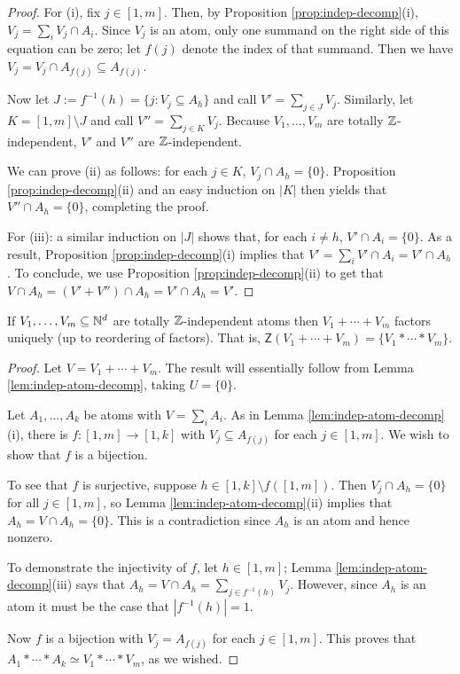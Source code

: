\begin{proof}
	For (i), fix $j\in [ 1,m ]$.
	Then, by Proposition \ref{prop:indep-decomp}(i), $V_j = \sum_i V_j \cap A_i$.
	Since $V_j$ is an atom, only one summand on the right side of this equation can be zero; let $f(j)$ denote the index of that summand.
	Then we have $V_j = V_j \cap A_{f(j)} \subseteq A_{f(j)}$.
	
	Now let $J := f^{-1}(h) = \{j: V_j \subseteq A_h\}$ and call $V' = \sum_{j\in J} V_j$.
	Similarly, let $K = [ 1,m ] \setminus J$ and call $V'' = \sum_{j\in K} V_j$.
	Because $V_1,\dots, V_m$ are totally $\mathbb{Z}$-independent, $V'$ and $V''$ are $\mathbb{Z}$-independent.

	We can prove (ii) as follows: for each $j\in K$, $V_j\cap A_h = \{0\}$.
	Proposition \ref{prop:indep-decomp}(ii) and an easy induction on $|K|$ then yields that $V'' \cap A_h = \{0\}$, completing the proof.
	
	For (iii): a similar induction on $|J|$ shows that, for each $i\neq h$, $V' \cap A_i = \{0\}$.
	As a result, Proposition \ref{prop:indep-decomp}(i) implies that $V' = \sum_i V'\cap A_i = V'\cap A_h$.
	To conclude, we use Proposition \ref{prop:indep-decomp}(ii) to get that 
	$V\cap A_h = (V'+V'')\cap A_h = V'\cap A_h = V'$.
\end{proof}

\begin{thm} \label{thm:ind-atoms}
	If $V_1,\dots,V_m\subseteq \mathbb{N}^d$ are totally $\mathbb{Z}$-independent atoms then $V_1+\cdots+V_m$ factors uniquely (up to reordering of factors).
	That is, $\mathsf{Z}(V_1+\cdots+V_m) = \{ V_1*\cdots*V_m\}$.
\end{thm}

\begin{proof}
	Let $V = V_1+\cdots + V_m$.
	The result will essentially follow from Lemma \ref{lem:indep-atom-decomp}, taking $U = \{0\}$.
	
	Let $A_1,\dots, A_k$ be atoms with $V = \sum_i A_i$.
	As in Lemma \ref{lem:indep-atom-decomp}(i), there is $f:[ 1,m ] \to [ 1,k]$ with $V_j \subseteq A_{f(j)}$ for each $j\in [ 1,m]$.
	We wish to show that $f$ is a bijection. 
	
	To see that $f$ is surjective, suppose $h\in [1,k]\setminus f([1,m])$.
	Then $V_j \cap A_h = \{0\}$ for all $j\in [1,m]$, so Lemma \ref{lem:indep-atom-decomp}(ii) implies that $A_h = V\cap A_h  = \{0\}$.
	This is a contradiction since $A_h$ is an atom and hence nonzero.
	
	To demonstrate the injectivity of $f$, let $h\in [1,m]$; Lemma \ref{lem:indep-atom-decomp}(iii) says that $A_h = V\cap A_h = \sum_{j\in f^{-1}(h)} V_j$.
	However, since $A_h$ is an atom it must be the case that $|f^{-1}(h)| =1$.
	
	Now $f$ is a bijection with $V_j = A_{f(j)}$ for each $j\in [1,m]$.
	This proves that $A_1*\cdots*A_k \simeq V_1*\cdots*V_m$, as we wished.
\end{proof}

